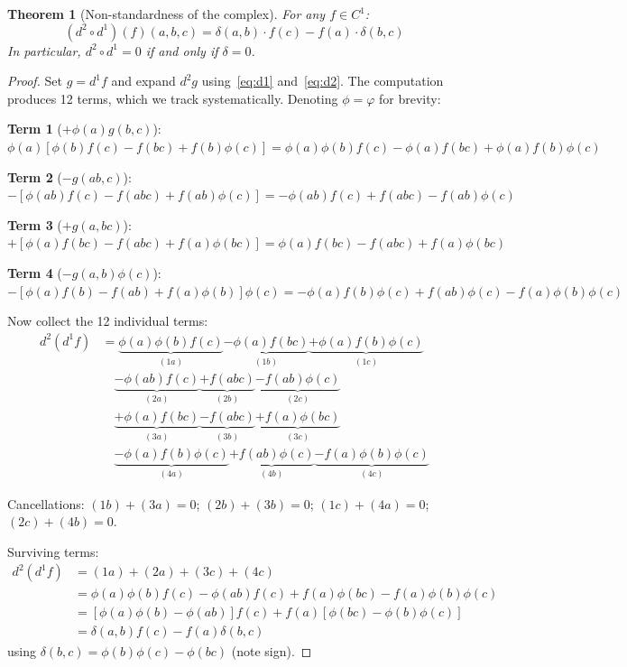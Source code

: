 \documentclass[11pt,a4paper]{article}
\theoremstyle{plain}
\newtheorem{theorem}{Theorem}[section]
\theoremstyle{definition}
\theoremstyle{remark}
\begin{document}
\begin{theorem}[Non-standardness of the complex]
\label{thm:non-standard}
For any $f \in C^1$:
\begin{equation}
\boxed{(d^2 \circ d^1)(f)(a, b, c) = \delta(a, b) \cdot f(c) - 
f(a) \cdot \delta(b, c)}
\label{eq:d2d1}
\end{equation}
In particular, $d^2 \circ d^1 = 0$ if and only if $\delta = 0$.
\end{theorem}

\begin{proof}
Set $g = d^1 f$ and expand $d^2 g$ using~\eqref{eq:d1} 
and~\eqref{eq:d2}. The computation produces 12 terms, which we track 
systematically. Denoting $\phi = \varphi$ for brevity:

\textbf{Term 1} ($+\phi(a) g(b,c)$):
$\phi(a)[\phi(b)f(c) - f(bc) + f(b)\phi(c)]
= \phi(a)\phi(b)f(c) - \phi(a)f(bc) + \phi(a)f(b)\phi(c)$

\textbf{Term 2} ($-g(ab, c)$):
$-[\phi(ab)f(c) - f(abc) + f(ab)\phi(c)]
= -\phi(ab)f(c) + f(abc) - f(ab)\phi(c)$

\textbf{Term 3} ($+g(a, bc)$):
$+[\phi(a)f(bc) - f(abc) + f(a)\phi(bc)]
= \phi(a)f(bc) - f(abc) + f(a)\phi(bc)$

\textbf{Term 4} ($-g(a,b)\phi(c)$):
$-[\phi(a)f(b) - f(ab) + f(a)\phi(b)]\phi(c)
= -\phi(a)f(b)\phi(c) + f(ab)\phi(c) - f(a)\phi(b)\phi(c)$

Now collect the 12 individual terms:
\begin{align*}
d^2(d^1 f) &= \underbrace{\phi(a)\phi(b)f(c)}_{(1a)} 
\underbrace{-\phi(a)f(bc)}_{(1b)} 
\underbrace{+\phi(a)f(b)\phi(c)}_{(1c)} \\
&\quad \underbrace{-\phi(ab)f(c)}_{(2a)} 
\underbrace{+f(abc)}_{(2b)} 
\underbrace{-f(ab)\phi(c)}_{(2c)} \\
&\quad \underbrace{+\phi(a)f(bc)}_{(3a)} 
\underbrace{-f(abc)}_{(3b)} 
\underbrace{+f(a)\phi(bc)}_{(3c)} \\
&\quad \underbrace{-\phi(a)f(b)\phi(c)}_{(4a)} 
\underbrace{+f(ab)\phi(c)}_{(4b)} 
\underbrace{-f(a)\phi(b)\phi(c)}_{(4c)}
\end{align*}

Cancellations:
$(1b) + (3a) = 0$;
$(2b) + (3b) = 0$;
$(1c) + (4a) = 0$;
$(2c) + (4b) = 0$.

Surviving terms:
\begin{align*}
d^2(d^1 f) &= (1a) + (2a) + (3c) + (4c) \\
&= \phi(a)\phi(b)f(c) - \phi(ab)f(c) + f(a)\phi(bc) - 
f(a)\phi(b)\phi(c) \\
&= [\phi(a)\phi(b) - \phi(ab)]f(c) + f(a)[\phi(bc) - 
\phi(b)\phi(c)] \\
&= \delta(a,b)f(c) - f(a)\delta(b,c)
\end{align*}
using $\delta(b,c) = \phi(b)\phi(c) - \phi(bc)$ (note sign).
\end{proof}
\end{document}
